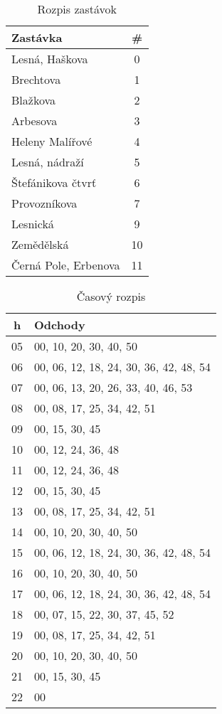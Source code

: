 \begin{table}[h]
  \centering
  \begin{tabular}{|l|c|}
    \hline
    \textbf{Zastávka} & \# \\ \hline
    Lesná, Haškova & 0 \\ \hline
    Brechtova & 1 \\ \hline
    Blažkova & 2 \\ \hline
    Arbesova & 3 \\ \hline
    Heleny Malířové & 4 \\ \hline
    Lesná, nádraží & 5 \\ \hline
    Štefánikova čtvrť & 6 \\ \hline
    Provozníkova & 7 \\ \hline
    Lesnická & 9 \\ \hline
    Zemědělská & 10 \\ \hline
    Černá Pole, Erbenova & 11 \\ \hline
  \end{tabular}
  \caption{Rozpis zastávok}
\end{table}

\begin{table}[h]
  \centering
  \begin{tabular}{|c|l|}
    \hline
      \textbf{h} & \textbf{Odchody} \\ \hline
      05 & 00, 10, 20, 30, 40, 50 \\ \hline
      06 & 00, 06, 12, 18, 24, 30, 36, 42, 48, 54 \\ \hline
      07 & 00, 06, 13, 20, 26, 33, 40, 46, 53 \\ \hline
      08 & 00, 08, 17, 25, 34, 42, 51 \\ \hline
      09 & 00, 15, 30, 45 \\ \hline
      10 & 00, 12, 24, 36, 48 \\ \hline
      11 & 00, 12, 24, 36, 48 \\ \hline
      12 & 00, 15, 30, 45 \\ \hline
      13 & 00, 08, 17, 25, 34, 42, 51 \\ \hline
      14 & 00, 10, 20, 30, 40, 50 \\ \hline
      15 & 00, 06, 12, 18, 24, 30, 36, 42, 48, 54 \\ \hline
      16 & 00, 10, 20, 30, 40, 50 \\ \hline
      17 & 00, 06, 12, 18, 24, 30, 36, 42, 48, 54 \\ \hline
      18 & 00, 07, 15, 22, 30, 37, 45, 52 \\ \hline
      19 & 00, 08, 17, 25, 34, 42, 51 \\ \hline
      20 & 00, 10, 20, 30, 40, 50 \\ \hline
      21 & 00, 15, 30, 45 \\ \hline
      22 & 00 \\ \hline
  \end{tabular}
  \caption{Časový rozpis}
\end{table}
